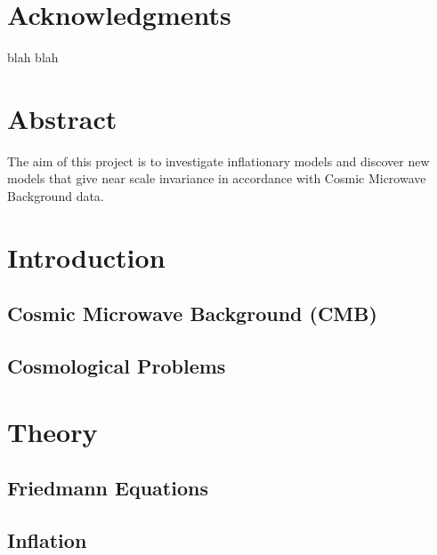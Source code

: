 \documentclass[12pt]{article} %
\begin{document}

\tableofcontents %

\newpage %
\section{Acknowledgments}

blah blah

\newpage

\section{Abstract}
The aim of this project is to investigate inflationary models and discover new models that give near scale invariance in accordance with Cosmic Microwave Background data.

\newpage

\section{Introduction} %

\subsection{Cosmic Microwave Background (CMB)}

\subsection{Cosmological Problems}

\section{Theory}

\subsection{Friedmann Equations}

\subsection{Inflation}
\end{document}
